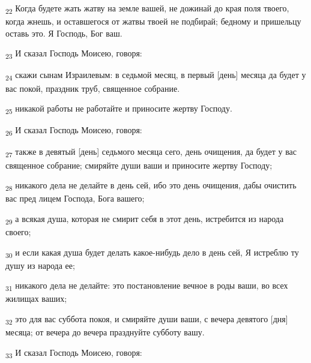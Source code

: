 \begin{tcolorbox}
\textsubscript{22} Когда будете жать жатву на земле вашей, не дожинай до края поля твоего, когда жнешь, и оставшегося от жатвы твоей не подбирай; бедному и пришельцу оставь это. Я Господь, Бог ваш.
\end{tcolorbox}
\begin{tcolorbox}
\textsubscript{23} И сказал Господь Моисею, говоря:
\end{tcolorbox}
\begin{tcolorbox}
\textsubscript{24} скажи сынам Израилевым: в седьмой месяц, в первый [день] месяца да будет у вас покой, праздник труб, священное собрание.
\end{tcolorbox}
\begin{tcolorbox}
\textsubscript{25} никакой работы не работайте и приносите жертву Господу.
\end{tcolorbox}
\begin{tcolorbox}
\textsubscript{26} И сказал Господь Моисею, говоря:
\end{tcolorbox}
\begin{tcolorbox}
\textsubscript{27} также в девятый [день] седьмого месяца сего, день очищения, да будет у вас священное собрание; смиряйте души ваши и приносите жертву Господу;
\end{tcolorbox}
\begin{tcolorbox}
\textsubscript{28} никакого дела не делайте в день сей, ибо это день очищения, дабы очистить вас пред лицем Господа, Бога вашего;
\end{tcolorbox}
\begin{tcolorbox}
\textsubscript{29} а всякая душа, которая не смирит себя в этот день, истребится из народа своего;
\end{tcolorbox}
\begin{tcolorbox}
\textsubscript{30} и если какая душа будет делать какое-нибудь дело в день сей, Я истреблю ту душу из народа ее;
\end{tcolorbox}
\begin{tcolorbox}
\textsubscript{31} никакого дела не делайте: это постановление вечное в роды ваши, во всех жилищах ваших;
\end{tcolorbox}
\begin{tcolorbox}
\textsubscript{32} это для вас суббота покоя, и смиряйте души ваши, с вечера девятого [дня] месяца; от вечера до вечера празднуйте субботу вашу.
\end{tcolorbox}
\begin{tcolorbox}
\textsubscript{33} И сказал Господь Моисею, говоря:
\end{tcolorbox}
